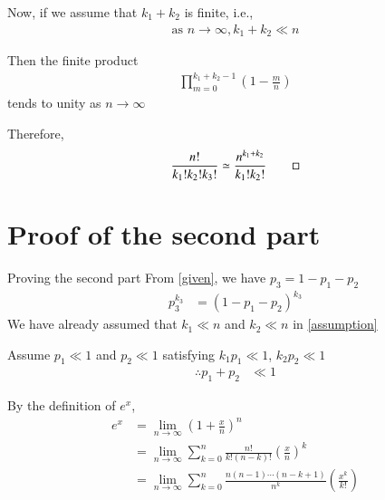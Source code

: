 \documentclass{beamer}
\providecommand{\brak}[1]{\ensuremath{\left(#1\right)}}
\begin{document}
	\begin{frame}
	Now, if we assume that $k_1 + k_2$ is finite, i.e.,
	\begin{align}
		\label{assumption}
		\text{as } n \to \infty, k_1 + k_2 \ll n
	\end{align}
	
	Then the finite product
	\begin{align}
		\prod_{m=0}^{k_1 + k_2 - 1} \brak{1 - \frac{m}{n}} 
	\end{align}
	tends to unity as $n \to \infty$
	
	\begin{block}{}
	Therefore,
		\begin{align}
			\frac{n!}{k_1! k_2! k_3!} \simeq \frac{n^{k_1 + k_2}}{k_1! k_2!} \qed
		\end{align}
	\end{block}
	\end{frame}

	\section{Proof of the second part}
	\begin{frame}{Proving the second part}
	From \eqref{given}, we have $p_3 = 1 - p_1 - p_2$ 
	\begin{align}
		p_3^{k_3} &= (1 - p_1 - p_2)^{k_3} 
	\end{align}
	We have already assumed that $k_1 \ll n$ and $k_2 \ll n$ in \eqref{assumption}
	
	Assume $p_1 \ll 1$ and $p_2 \ll 1$ satisfying $k_1 p_1 \ll 1$,  $k_2 p_2 \ll 1$
	\begin{align}
		\therefore p_1 + p_2 &\ll 1
	\end{align}
	 
	By the definition of $e^x$,
	\begin{align}
		e^x &= \lim_{n \to \infty} \brak{1 + \frac{x}{n}}^n \\
		&= \lim_{n \to \infty} \sum_{k=0}^n \frac{n!}{k! (n-k)!} \brak{\frac{x}{n}}^k \\
		&= \lim_{n \to \infty} \sum_{k=0}^n \frac{n (n-1) \cdots (n-k+1)}{n^k} \brak{\frac{x^k}{k!}}  \\
	\end{align}
	\end{frame}
	
\end{document}
